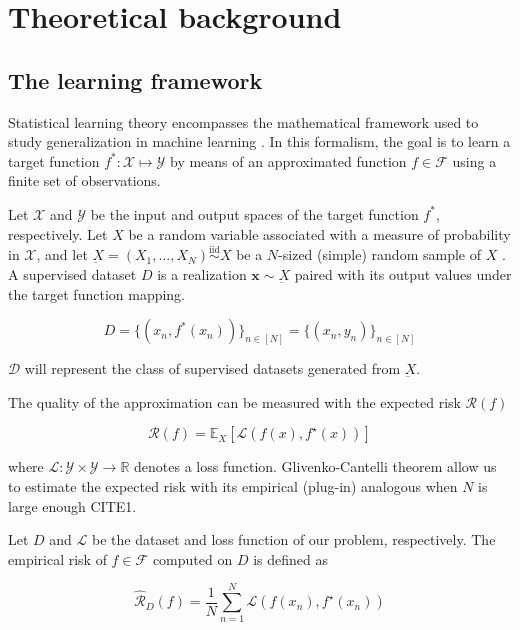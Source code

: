 \chapter{Theoretical background }\label{sec:theory}

\section{The learning framework}

Statistical learning theory encompasses the mathematical framework used to
study generalization in machine learning
\cite{n.vapnikNatureStatisticalLearning2000,jimenezInductiveBiasDeep}.
In this formalism, the goal
is to learn a target function $f^*: \mathcal{X} \longmapsto \mathcal{Y}$ by means of an approximated
function $f \in \mathcal{F}$ using a finite set of observations. 

\begin{definition}\label{def:dataset}
    Let $\mathcal{X}$ and $\mathcal{Y}$ be
    the input and output spaces of the target function $f^*$, respectively. Let $X$ 
    be a random variable associated with a measure of probability in $\mathcal{X}$, 
    and let $\underbar{X} = (X_1, ..., X_N) \overset{\text{iid}}{\sim} X$ be a $N$-sized (simple)
    random sample of $X$ 
    \cite{casellaStatisticalInference2002}.
    A supervised dataset $D$ is a realization
     $\bm{x} \sim \underbar{X}$ paired with its output values under the 
     target function mapping.

    $$
    D = \{(x_n, f^*(x_n))\}_{n \in [N]} = \{(x_n, y_n)\}_{n \in [N]}
    $$

    $\mathcal{D}$ will represent the class of supervised datasets generated from $\underbar{X}$.
\end{definition}

The quality of the approximation can be measured with the expected risk $\mathcal{R}(f)$

$$
\mathcal{R}(f)=\mathbb{E}_{X} [\mathcal{L}(f(x),f^\star(x))]
$$

where $\mathcal{L}: \mathcal{Y} \times \mathcal{Y} \to \mathbb{R}$ denotes a loss function. Glivenko-Cantelli theorem allow us to
estimate the expected risk with its empirical (plug-in) analogous when $N$ is large enough CITE1.

\begin{definition}\label{def:erm}
    Let $D$ and $\mathcal{L}$ be the dataset and loss function of our problem, respectively. The empirical risk of $f \in \mathcal{F}$
    computed on $D$ is defined as

    $$
    \hat{\mathcal{R}}_D(f)=\frac{1}{N}\sum_{n=1}^{N}\mathcal{L}(f(x_{n}),f^{\star}(x_{n}))
    $$
\end{definition}

